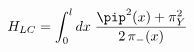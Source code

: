 \begin{equation}
\label{eq:FT continuum Hamiltonian 1}
    H_{LC} = \int_0^l dx\;
    \frac{\pip^2 (x) + \pi_Y^2}{2 \, \pi_- (x)}
\end{equation}

